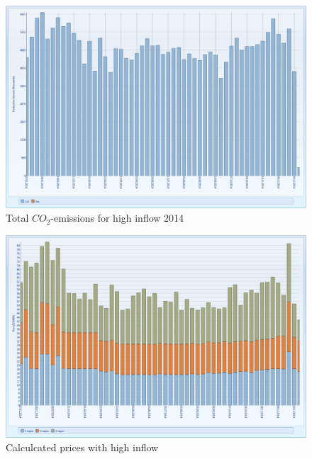 \documentclass{article}
\begin{document}
\begin{figure}[htbp]
\begin{center}
\includegraphics[width=13cm,keepaspectratio=true]{figures/wetcase/MTCO2wet}
\caption{Total $CO_2$-emissions for high inflow 2014}
\label{fig:MTemissionswet}
\end{center}
\end{figure}
\begin{figure}[htbp]
\begin{center}
\includegraphics[width=13cm,keepaspectratio=true]{figures/wetcase/MTpriceswet}
\caption{Calculcated prices with high inflow}
\label{fig:MTpriceswet}
\end{center}
\end{figure}
\end{document}

